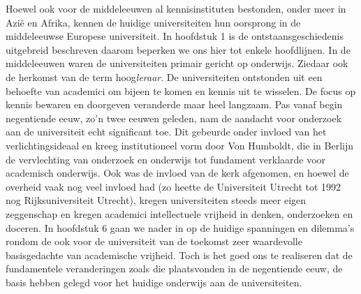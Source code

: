 \documentclass[smallauthor, chapterhaspagenum, nochapterinheader, pagenuminheader,  bigchapnum,medium2, tocpages,  garamond, titleinheader]{jote-book}
\begin{document}
	Hoewel ook voor de middeleeuwen al kennisinstituten bestonden, onder meer in Azië en Afrika, kennen de huidige universiteiten hun oorsprong in de middeleeuwse Europese universiteit. In hoofdstuk 1 is de ontstaansgeschiedenis uitgebreid beschreven daarom beperken we ons hier tot enkele hoofdlijnen. In de middeleeuwen waren de universiteiten primair gericht op onderwijs. Ziedaar ook de herkomst van de term hoog\emph{leraar}. De universiteiten ontstonden uit een behoefte van academici om bijeen te komen en kennis uit te wisselen. De focus op kennis bewaren en doorgeven veranderde maar heel langzaam. Pas vanaf begin negentiende eeuw, zo'n twee eeuwen geleden, nam de aandacht voor onderzoek aan de universiteit echt significant toe. Dit gebeurde onder invloed van het verlichtingsideaal en kreeg institutioneel vorm door Von Humboldt, die in Berlijn de vervlechting van onderzoek en onderwijs tot fundament verklaarde voor academisch onderwijs. Ook was de invloed van de kerk afgenomen, en hoewel de overheid vaak nog veel invloed had (zo heette de Universiteit Utrecht tot 1992 nog Rijksuniversiteit Utrecht), kregen universiteiten steeds meer eigen zeggenschap en kregen academici intellectuele vrijheid in denken, onderzoeken en doceren. In hoofdstuk 6 gaan we nader in op de huidige spanningen en dilemma's rondom de ook voor de universiteit van de toekomst zeer waardevolle basisgedachte van academische vrijheid. Toch is het goed ons te realiseren dat de fundamentele veranderingen zoals die plaatsvonden in de negentiende eeuw, de basis hebben gelegd voor het huidige onderwijs aan de universiteiten.
\end{document}

